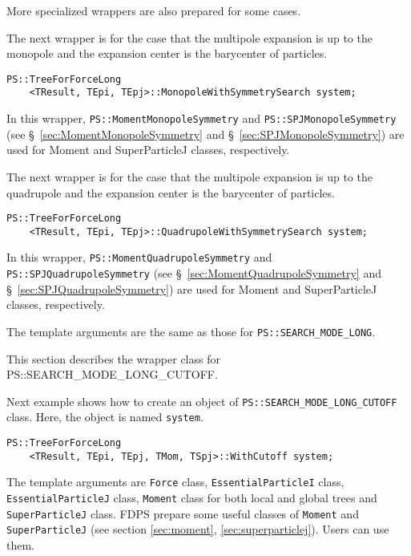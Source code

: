 More specialized wrappers are also prepared for some cases.

The next wrapper is for the case that the multipole expansion is up to the monopole and the expansion center is the barycenter of particles.

\begin{screen}
\begin{verbatim}
PS::TreeForForceLong
    <TResult, TEpi, TEpj>::MonopoleWithSymmetrySearch system;
\end{verbatim}
\end{screen}

In this wrapper, \texttt{PS::MomentMonopoleSymmetry} and \texttt{PS::SPJMonopoleSymmetry} (see \S~\ref{sec:MomentMonopoleSymmetry} and \S~\ref{sec:SPJMonopoleSymmetry}) are used for Moment and SuperParticleJ classes, respectively.


The next wrapper is for the case that the multipole expansion is up to the quadrupole and the expansion center is the barycenter of particles.

\begin{screen}
\begin{verbatim}
PS::TreeForForceLong
    <TResult, TEpi, TEpj>::QuadrupoleWithSymmetrySearch system;
\end{verbatim}
\end{screen}

In this wrapper, \texttt{PS::MomentQuadrupoleSymmetry} and \texttt{PS::SPJQuadrupoleSymmetry} (see \S~\ref{sec:MomentQuadrupoleSymmetry} and \S~\ref{sec:SPJQuadrupoleSymmetry}) are used for Moment and SuperParticleJ classes, respectively.


The template arguments are the same as those for \texttt{PS::SEARCH\_MODE\_LONG}. 



This section describes the wrapper class for PS::SEARCH\_MODE\_LONG\_CUTOFF.

Next example shows how to create an object of {\tt PS::SEARCH\_MODE\_LONG\_CUTOFF} class. Here, the object is named {\tt system}.

\begin{screen}
\begin{verbatim}
PS::TreeForForceLong
    <TResult, TEpi, TEpj, TMom, TSpj>::WithCutoff system;
\end{verbatim}
\end{screen}

The template arguments are {\tt Force} class, {\tt EssentialParticleI} class, {\tt EssentialParticleJ} class, {\tt Moment} class for both local and global trees and {\tt SuperParticleJ} class. FDPS prepare some useful classes of {\tt Moment} and {\tt SuperParticleJ} (see section \ref{sec:moment}, \ref{sec:superparticlej}). Users can use them.

